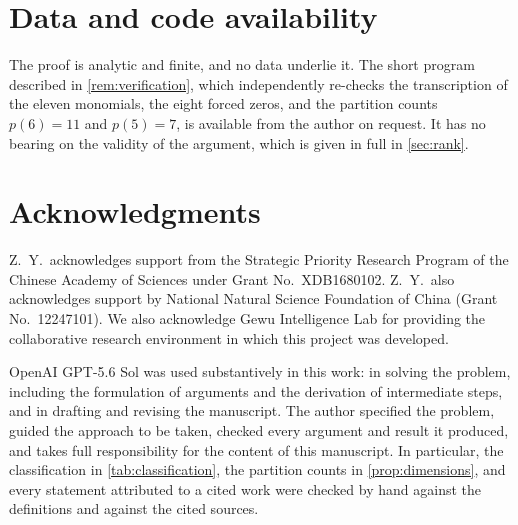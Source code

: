 \documentclass[11pt,reqno]{amsart}
\theoremstyle{plain}
\theoremstyle{definition}
\theoremstyle{remark}
\numberwithin{equation}{section}
\begin{document}
\section*{Data and code availability}

The proof is analytic and finite, and no data underlie it. The short program
described in \cref{rem:verification}, which independently re-checks the
transcription of the eleven monomials, the eight forced zeros, and the
partition counts $p(6)=11$ and $p(5)=7$, is available from the author on
request. It has no bearing on the validity of the argument, which is given in
full in \cref{sec:rank}.

\section*{Acknowledgments}

Z.\ Y.\ acknowledges support from the Strategic Priority Research Program of
the Chinese Academy of Sciences under Grant No.~XDB1680102. Z.\ Y.\ also
acknowledges support by National Natural Science Foundation of China (Grant
No.~12247101). We also acknowledge Gewu Intelligence Lab for providing the
collaborative research environment in which this project was developed.

OpenAI GPT-5.6 Sol was used substantively in this work: in solving the
problem, including the formulation of arguments and the derivation of
intermediate steps, and in drafting and revising the manuscript. The author
specified the problem, guided the approach to be taken, checked every argument
and result it produced, and takes full responsibility for the content of this
manuscript. In particular, the classification in \cref{tab:classification},
the partition counts in \cref{prop:dimensions}, and every statement
attributed to a cited work were checked by hand against the definitions and
against the cited sources.



\end{document}
